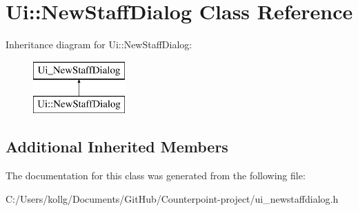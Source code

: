 \hypertarget{class_ui_1_1_new_staff_dialog}{}\section{Ui\+:\+:New\+Staff\+Dialog Class Reference}
\label{class_ui_1_1_new_staff_dialog}
Inheritance diagram for Ui\+:\+:New\+Staff\+Dialog\+:\begin{figure}[H]
\begin{center}
\leavevmode
\includegraphics[height=2.000000cm]{class_ui_1_1_new_staff_dialog}
\end{center}
\end{figure}
\subsection*{Additional Inherited Members}


The documentation for this class was generated from the following file\+:\begin{DoxyCompactItemize}
\item 
C\+:/\+Users/kollg/\+Documents/\+Git\+Hub/\+Counterpoint-\/project/ui\+\_\+newstaffdialog.\+h\end{DoxyCompactItemize}
